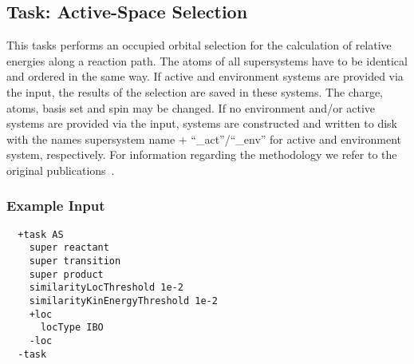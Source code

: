 \subsection{Task: Active-Space Selection\label{sec:activeSpaceTask}}
This tasks performs an occupied orbital selection for the calculation of relative
energies along a reaction path. The atoms of all supersystems have to be identical
and ordered in the same way. If active and environment systems are provided via the
input, the results of the selection are saved in these systems. The charge, atoms, basis
set and spin may be changed. If no environment and/or active systems are provided
via the input, systems are constructed and written to disk with the names
supersystem name + ``\_act''/``\_env'' for active and environment system, respectively.
For information regarding the methodology we refer to the original publications~\cite{Bensberg2019a,Bensberg2020}.

\subsubsection{Example Input}
\begin{lstlisting}
  +task AS
    super reactant  
    super transition
    super product
    similarityLocThreshold 1e-2
    similarityKinEnergyThreshold 1e-2
    +loc
      locType IBO
    -loc
  -task
 \end{lstlisting}
